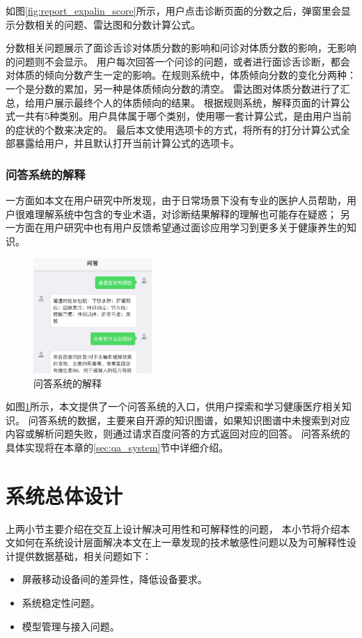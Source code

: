 如图\ref{fig:report_expalin_score}所示，用户点击诊断页面的分数之后，弹窗里会显示分数相关的问题、雷达图和分数计算公式。

分数相关问题展示了面诊舌诊对体质分数的影响和问诊对体质分数的影响，无影响的问题则不会显示。
用户每次回答一个问诊的问题，或者进行面诊舌诊断，都会对体质的倾向分数产生一定的影响。在规则系统中，体质倾向分数的变化分两种：一个是分数的累加，另一种是体质倾向分数的清空。
雷达图对体质分数进行了汇总，给用户展示最终个人的体质倾向的结果。
根据规则系统，解释页面的计算公式一共有5种类别。用户具体属于哪个类别，使用哪一套计算公式，是由用户当前的症状的个数来决定的。
最后本文使用选项卡的方式，将所有的打分计算公式全部暴露给用户，并且默认打开当前计算公式的选项卡。

\subsubsection{问答系统的解释}



一方面如本文在用户研究中所发现，由于日常场景下没有专业的医护人员帮助，用户很难理解系统中包含的专业术语，对诊断结果解释的理解也可能存在疑惑；
另一方面在用户研究中也有用户反馈希望通过面诊应用学习到更多关于健康养生的知识。

\begin{figure}[h]
    \centering
    \includegraphics[width=4.5cm]{images/ans2.png}
    \caption{问答系统的解释}
    \label{fig:explain_qa}
\end{figure}

如图\ref{fig:explain_qa}所示，本文提供了一个问答系统的入口，供用户探索和学习健康医疗相关知识。
问答系统的数据，主要来自开源的知识图谱，如果知识图谱中未搜索到对应内容或解析问题失败，则通过请求百度问答的方式返回对应的回答。
问答系统的具体实现将在本章的\ref{sec:qa_system}节中详细介绍。



\section{系统总体设计}
上两小节主要介绍在交互上设计解决可用性和可解释性的问题，
本小节将介绍本文如何在系统设计层面解决本文在上一章发现的技术敏感性问题以及为可解释性设计提供数据基础，相关问题如下：
\begin{itemize}
    \item 屏蔽移动设备间的差异性，降低设备要求。
    \item 系统稳定性问题。
    \item 模型管理与接入问题。
\end{itemize}


